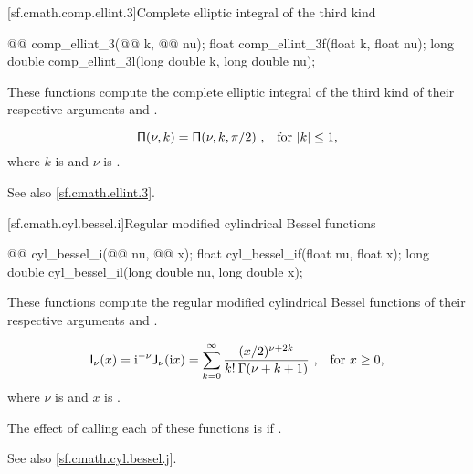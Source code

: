 [sf.cmath.comp.ellint.3]{Complete elliptic integral of the third kind}%
%
%
%
%
%
\begin{itemdecl}
@@ comp_ellint_3(@@ k, @@ nu);
float        comp_ellint_3f(float k, float nu);
long double  comp_ellint_3l(long double k, long double nu);
\end{itemdecl}

\begin{itemdescr}
\pnum
\effects
These functions compute
the complete elliptic integral of the third kind
of their respective arguments
 and .

\pnum
\returns
\[ \mathsf{\Pi}(\nu, k) = \mathsf{\Pi}(\nu, k, \pi / 2) \text{ ,\quad for $|k| \le 1$,} \]
where
$k$ is  and
$\nu$ is .

\pnum
See also \ref{sf.cmath.ellint.3}.
\end{itemdescr}

[sf.cmath.cyl.bessel.i]{Regular modified cylindrical Bessel functions}%
%
%
%
%
%
\begin{itemdecl}
@@ cyl_bessel_i(@@ nu, @@ x);
float        cyl_bessel_if(float nu, float x);
long double  cyl_bessel_il(long double nu, long double x);
\end{itemdecl}

\begin{itemdescr}
\pnum
\effects
These functions compute
the regular modified cylindrical Bessel functions
of their respective arguments
 and .

\pnum
\returns
\[ \mathsf{I}_\nu(x) =
     \mathrm{i}^{-\nu} \mathsf{J}_\nu(\mathrm{i}x) =
     \sum_{k=0}^\infty \frac{(x/2)^{\nu+2k}}{k! \: \Gamma(\nu+k+1)}
     \text{ ,\quad for $x \ge 0$,} \]
where
$\nu$ is  and
$x$ is .

\pnum
\remarks
The effect of calling each of these functions
is 
if .

\pnum
See also \ref{sf.cmath.cyl.bessel.j}.
\end{itemdescr}

